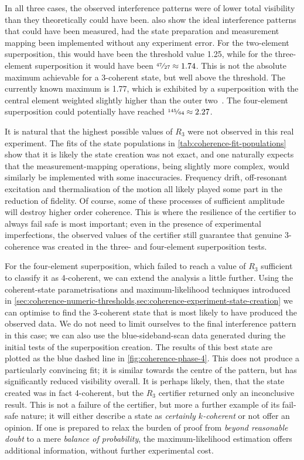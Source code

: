In all three cases, the observed interference patterns were of lower total visibility than they theoretically could have been.
 also show the ideal interference patterns that could have been measured, had the state preparation and measurement mapping been implemented without any experiment error.
For the two-element superposition, this would have been the threshold value \num{1.25}, while for the three-element superposition it would have been $\text{\sfrac{47}{27}}\approx\num{1.74}$.
This is not the absolute maximum achievable for a 3-coherent state, but well above the threshold.
The currently known maximum is \num{1.77}, which is exhibited by a superposition with the central element weighted slightly higher than the outer two~\cite{Dive2020}.
The four-element superposition could potentially have reached $\text{\sfrac{145}{64}}\approx\num{2.27}$.

It is natural that the highest possible values of $R_3$ were not observed in this real experiment.
The fits of the state populations in \cref{tab:coherence-fit-populations} show that it is likely the state creation was not exact, and one naturally expects that the measurement-mapping operations, being slightly more complex, would similarly be implemented with some inaccuracies.
Frequency drift, off-resonant excitation and thermalisation of the motion all likely played some part in the reduction of fidelity.
Of course, some of these processes of sufficient amplitude will destroy higher order coherence.
This is where the resilience of the certifier to always fail safe is most important; even in the presence of experimental imperfections, the observed values of the certifier still guarantee that genuine 3-coherence was created in the three- and four-element superposition tests.

For the four-element superposition, which failed to reach a value of $R_3$ sufficient to classify it as 4-coherent, we can extend the analysis a little further.
Using the coherent-state parametrisations and maximum-likelihood techniques introduced in \cref{sec:coherence-numeric-thresholds,sec:coherence-experiment-state-creation} we can optimise to find the 3-coherent state that is most likely to have produced the observed data.
We do not need to limit ourselves to the final interference pattern in this case; we can also use the blue-sideband-scan data generated during the initial tests of the superposition creation.
The results of this best state are plotted as the blue dashed line in \cref{fig:coherence-phase-4}.
This does not produce a particularly convincing fit; it is similar towards the centre of the pattern, but has significantly reduced visibility overall.
It is perhaps likely, then, that the state created was in fact 4-coherent, but the $R_3$ certifier returned only an inconclusive result.
This is not a failure of the certifier, but more a further example of its fail-safe nature; it will either describe a state as \emph{certainly $k$-coherent} or not offer an opinion.
If one is prepared to relax the burden of proof from \emph{beyond reasonable doubt} to a mere \emph{balance of probability}, the maximum-likelihood estimation offers additional information, without further experimental cost.



